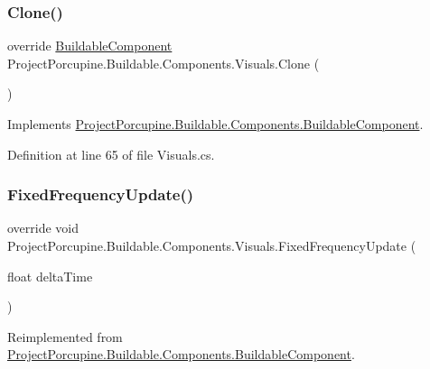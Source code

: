 \subsubsection{\texorpdfstring{Clone()}{Clone()}}
{\footnotesize\ttfamily override \hyperlink{class_project_porcupine_1_1_buildable_1_1_components_1_1_buildable_component}{Buildable\+Component} Project\+Porcupine.\+Buildable.\+Components.\+Visuals.\+Clone (\begin{DoxyParamCaption}{ }\end{DoxyParamCaption})\hspace{0.3cm}{\ttfamily [virtual]}}



Implements \hyperlink{class_project_porcupine_1_1_buildable_1_1_components_1_1_buildable_component_acfe1aedeaf167118ca5d0d2b046e00fb}{Project\+Porcupine.\+Buildable.\+Components.\+Buildable\+Component}.



Definition at line 65 of file Visuals.\+cs.

\mbox{\label{class_project_porcupine_1_1_buildable_1_1_components_1_1_visuals_a3650e3d2ff6aef61090eeaf900f9a041}} 
\subsubsection{\texorpdfstring{Fixed\+Frequency\+Update()}{FixedFrequencyUpdate()}}
{\footnotesize\ttfamily override void Project\+Porcupine.\+Buildable.\+Components.\+Visuals.\+Fixed\+Frequency\+Update (\begin{DoxyParamCaption}\item[{float}]{delta\+Time }\end{DoxyParamCaption})\hspace{0.3cm}{\ttfamily [virtual]}}



Reimplemented from \hyperlink{class_project_porcupine_1_1_buildable_1_1_components_1_1_buildable_component_a0528e50f3dbe24481256802e758deeb9}{Project\+Porcupine.\+Buildable.\+Components.\+Buildable\+Component}.



